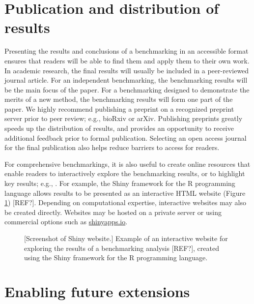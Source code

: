 \documentclass[12pt, a4paper]{article}
\begin{document}
\section*{Publication and distribution of results}

Presenting the results and conclusions of a benchmarking in an accessible format ensures that readers will be able to find them and apply them to their own work. In academic research, the final results will usually be included in a peer-reviewed journal article. For an independent benchmarking, the benchmarking results will be the main focus of the paper. For a benchmarking designed to demonstrate the merits of a new method, the benchmarking results will form one part of the paper. We highly recommend publishing a preprint on a recognized preprint server prior to peer review; e.g., bioRxiv or arXiv. Publishing preprints greatly speeds up the distribution of results, and provides an opportunity to receive additional feedback prior to formal publication. Selecting an open access journal for the final publication also helps reduce barriers to access for readers.

For comprehensive benchmarkings, it is also useful to create online resources that enable readers to interactively explore the benchmarking results, or to highlight key results; e.g., \citep{Wiwie2015, Soneson2018}. For example, the Shiny framework for the R programming language allows results to be presented as an interactive HTML website (Figure \ref{fig:shiny}) [REF?]. Depending on computational expertise, interactive websites may also be created directly. Websites may be hosted on a private server or using commercial options such as \url{shinyapps.io}.



\vskip 5mm

\begin{figure}[H]
\begin{center}
\end{center}
\caption{[Screenshot of Shiny website.] Example of an interactive website for exploring the results of a benchmarking analysis [REF?], created using the Shiny framework for the R programming language.}
\label{fig:shiny}
\end{figure}




\section*{Enabling future extensions}
\end{document}
